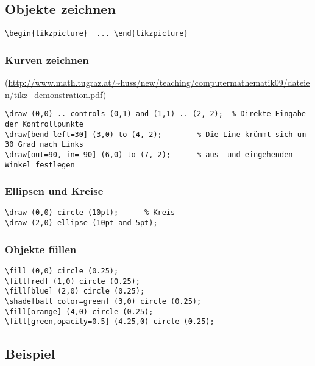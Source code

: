 \subsection{Objekte zeichnen}
\lstinline|\begin{tikzpicture}	...	\end{tikzpicture}|

\subsubsection{Kurven zeichnen}
(\url{http://www.math.tugraz.at/~huss/new/teaching/computermathematik09/dateien/tikz_demonstration.pdf})
\begin{lstlisting}
\draw (0,0) .. controls (0,1) and (1,1) .. (2, 2);	% Direkte Eingabe der Kontrollpunkte
\draw[bend left=30] (3,0) to (4, 2);		% Die Line krümmt sich um 30 Grad nach Links
\draw[out=90, in=-90] (6,0) to (7, 2);		% aus- und eingehenden Winkel festlegen
\end{lstlisting}

\subsubsection{Ellipsen und Kreise}
\begin{lstlisting}
\draw (0,0) circle (10pt);		% Kreis
\draw (2,0) ellipse (10pt and 5pt);
\end{lstlisting}

\subsubsection{Objekte füllen}
\begin{lstlisting}
\fill (0,0) circle (0.25);
\fill[red] (1,0) circle (0.25);
\fill[blue] (2,0) circle (0.25);
\shade[ball color=green] (3,0) circle (0.25);
\fill[orange] (4,0) circle (0.25);
\fill[green,opacity=0.5] (4.25,0) circle (0.25);
\end{lstlisting}





\columnbreak


\subsection*{Beispiel}

